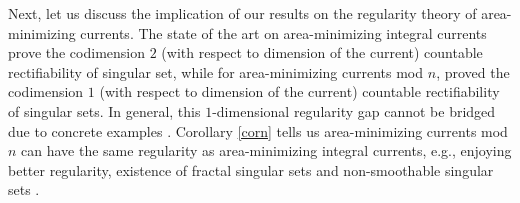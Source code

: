 \documentclass[11pt,a4paper]{amsart}
\numberwithin{equation}{section}
\theoremstyle{plain}
\theoremstyle{definition}
\numberwithin{equation}{subsection}
\begin{document}
Next, let us discuss the implication of our results on the regularity theory of area-minimizing currents. The state of the art on area-minimizing integral currents \cite{DMS1,DMS2,DMS3,BK1,BK2,BK3} prove the codimension $2$ (with respect to dimension of the current) countable rectifiability of singular set, while for area-minimizing currents mod $n$, \cite{DMSmodq,DHMSS,MWmodp} proved the codimension $1$ (with respect to dimension of the current) countable rectifiability of singular sets. In general, this $1$-dimensional regularity gap cannot be bridged due to concrete examples \cite[second remark after Theorem E]{MWmodp}. Corollary \ref{corn} tells us area-minimizing currents mod $n$ can have the same regularity as area-minimizing integral currents, e.g., enjoying better regularity, existence of fractal singular sets \cite{ZLa} and non-smoothable singular sets \cite{ZLns}. 
\end{document}
